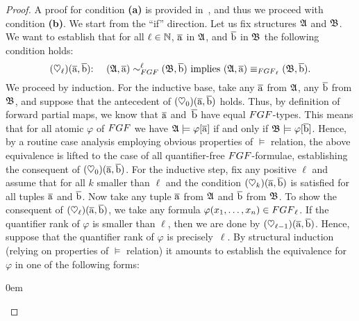 \begin{proof}
  A proof for condition \textbf{(a)} is provided in~\cite[Lemma 3]{BednarczykJ22}, and thus we proceed with condition \textbf{(b)}.
  We start from the ``if'' direction.
  Let us fix structures ${\mathfrak{A}}$ and ${\mathfrak{B}}$.
  We want to establish that for all $\ell \in {\mathbb{N}}$, $\overline{\mathrm{a}}$ in ${\mathfrak{A}}$, and $\overline{\mathrm{b}}$ in ${\mathfrak{B}}$ the following condition holds:
  \[
    (\heartsuit_\ell)(\elemtuplea, \elemtupleb){:} \ \ \ \  (\str{A}, \elemtuplea) \bisimto_{\FGF}^{\ell} (\str{B}, \elemtupleb) \ \text{implies} \ (\str{A}, \elemtuplea) \equiv_{\FGF_\ell} (\str{B}, \elemtupleb).
  \]
  We proceed by induction.
  For the inductive base, take any $\overline{\mathrm{a}}$ from ${\mathfrak{A}}$, any $\overline{\mathrm{b}}$ from ${\mathfrak{B}}$, and suppose that the antecedent of $(\heartsuit_0)(\overline{\mathrm{a}},\overline{\mathrm{b}})$ holds.
  Thus, by definition of forward partial maps, we know that $\overline{\mathrm{a}}$ and~$\overline{\mathrm{b}}$ have equal $\FGF$-types.
  This means that for all atomic $\varphi$ of $\FGF$ we have ${\mathfrak{A}} \models \varphi[\overline{\mathrm{a}}]$ if and only if ${\mathfrak{B}} \models \varphi[\overline{\mathrm{b}}]$.
  Hence, by a routine case analysis employing obvious properties of $\models$ relation, the above equivalence is lifted to the case of all quantifier-free $\FGF$-formulae, establishing the consequent of $(\heartsuit_0)(\overline{\mathrm{a}},\overline{\mathrm{b}})$.
  For the inductive step, fix any positive $\ell$ and assume that for all $k$ smaller than $\ell$ and the condition $(\heartsuit_k)(\overline{\mathrm{a}},\overline{\mathrm{b}})$ is satisfied for all tuples $\overline{\mathrm{a}}$ and $\overline{\mathrm{b}}$.
  Now take any tuple $\overline{\mathrm{a}}$ from ${\mathfrak{A}}$ and $\overline{\mathrm{b}}$ from ${\mathfrak{B}}$.
  To show the consequent of $(\heartsuit_\ell)(\overline{\mathrm{a}},\overline{\mathrm{b}})$, we take any formula $\varphi(x_1, \ldots, x_n) \in \FGF_\ell$.
  If the quantifier rank of $\varphi$ is smaller than $\ell$, then we are done by $(\heartsuit_{\ell{-}1})(\overline{\mathrm{a}},\overline{\mathrm{b}})$.
  Hence, suppose that the quantifier rank of $\varphi$ is precisely~$\ell$.
  By structural induction (relying on properties of $\models$ relation) it amounts to establish the equivalence for $\varphi$ in one of the following forms:
  \begin{itemize}\itemsep0em


\end{itemize}
\end{proof}
